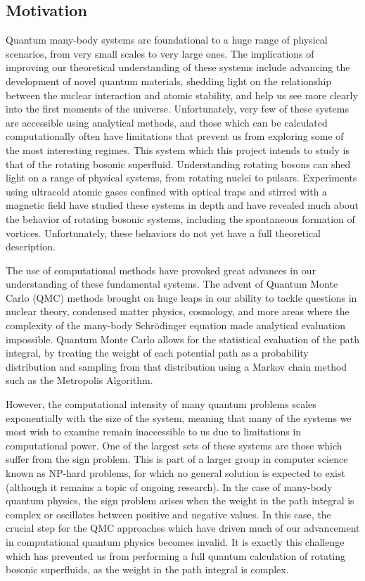 \documentclass[onecolumn, 12pt]{article}
\begin{document}
\subsection{Motivation}
Quantum many-body systems are foundational to a huge range of physical scenarios, from very small scales to very large ones. The implications of improving our theoretical understanding of these systems include advancing the development of novel quantum materials, shedding light on the relationship between the nuclear interaction and atomic stability, and help us see more clearly into the first moments of the universe. Unfortunately, very few of these systems are accessible using analytical methods, and those which can be calculated computationally often have limitations that prevent us from exploring some of the most interesting regimes. This system which this project intends to study is that of the rotating bosonic superfluid. Understanding rotating bosons can shed light on a range of physical systems, from rotating nuclei to pulsars. Experiments using ultracold atomic gases confined with optical traps and stirred with a magnetic field have studied these systems in depth and have revealed much about the behavior of rotating bosonic systems, including the spontaneous formation of vortices. Unfortunately, these behaviors do not yet have a full theoretical description.

The use of computational methods have provoked great advances in our understanding of these fundamental systems. The advent of Quantum Monte Carlo (QMC) methods brought on huge leaps in our ability to tackle questions in nuclear theory, condensed matter physics, cosmology, and more areas where the complexity of the many-body Schr\"{o}dinger equation made analytical evaluation impossible. Quantum Monte Carlo allows for the statistical evaluation of the path integral, by treating the weight of each potential path as a probability distribution and sampling from that distribution using a Markov chain method such as the Metropolis Algorithm. 

However, the computational intensity of many quantum problems scales exponentially with the size of the system, meaning that many of the systems we most wish to examine remain inaccessible to us due to limitations in computational power. One of the largest sets of these systems are those which suffer from the sign problem. This is part of a larger group in computer science known as NP-hard problems, for which no general solution is expected to exist (although it remains a topic of ongoing research). In the case of many-body quantum physics, the sign problem  arises when the weight in the path integral is complex or oscillates between positive and negative values. In this case, the crucial step for the QMC approaches which have driven much of our advancement in computational quantum physics becomes invalid. It is exactly this challenge which has prevented us from performing a full quantum calculation of rotating bosonic superfluids, as the weight in the path integral is complex.
\end{document}
